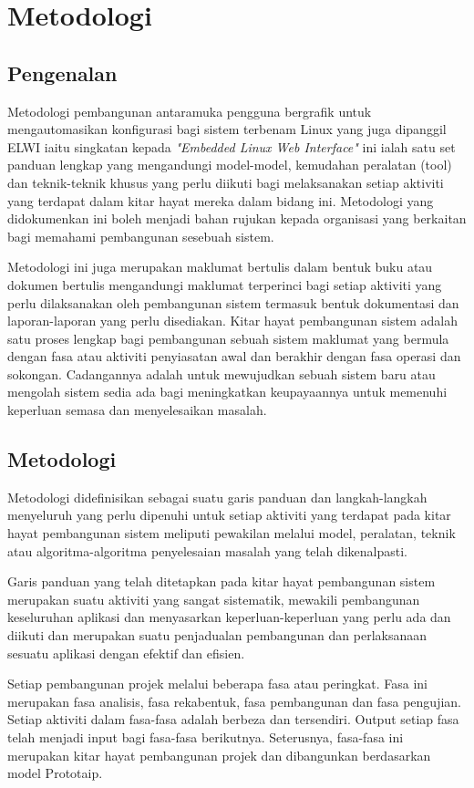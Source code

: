 \chapter{Metodologi}\label{c3}

\section{Pengenalan}
Metodologi pembangunan antaramuka pengguna bergrafik untuk mengautomasikan konfigurasi bagi sistem terbenam Linux yang juga dipanggil ELWI iaitu singkatan kepada \textit{"Embedded Linux Web Interface"} ini ialah satu set panduan lengkap yang mengandungi model-model, kemudahan peralatan (tool) dan teknik-teknik khusus yang perlu diikuti bagi melaksanakan setiap aktiviti yang terdapat dalam kitar hayat mereka dalam bidang ini. Metodologi yang didokumenkan ini boleh menjadi bahan rujukan kepada organisasi yang berkaitan bagi memahami pembangunan sesebuah sistem. 

Metodologi ini juga merupakan maklumat bertulis dalam bentuk buku atau dokumen bertulis mengandungi maklumat terperinci bagi setiap aktiviti yang perlu dilaksanakan oleh pembangunan sistem termasuk bentuk dokumentasi dan laporan-laporan yang perlu disediakan. Kitar hayat pembangunan sistem adalah satu proses lengkap bagi pembangunan sebuah sistem maklumat yang bermula dengan fasa atau aktiviti penyiasatan awal dan berakhir dengan fasa operasi dan sokongan. Cadangannya adalah untuk mewujudkan sebuah sistem baru atau mengolah sistem sedia ada bagi meningkatkan keupayaannya untuk memenuhi keperluan semasa dan menyelesaikan masalah.

\section{Metodologi}
Metodologi didefinisikan sebagai suatu garis panduan dan langkah-langkah menyeluruh yang perlu dipenuhi untuk setiap aktiviti yang terdapat pada kitar hayat pembangunan sistem meliputi pewakilan melalui model, peralatan, teknik atau algoritma-algoritma penyelesaian masalah yang telah dikenalpasti. 

Garis panduan yang telah ditetapkan pada kitar hayat pembangunan sistem merupakan suatu aktiviti yang sangat sistematik, mewakili pembangunan keseluruhan aplikasi dan menyasarkan keperluan-keperluan yang perlu ada dan diikuti dan merupakan suatu penjadualan pembangunan dan perlaksanaan sesuatu aplikasi dengan efektif dan efisien.

Setiap pembangunan projek melalui beberapa fasa atau peringkat. Fasa ini merupakan fasa analisis, fasa rekabentuk, fasa pembangunan dan fasa pengujian. Setiap aktiviti dalam fasa-fasa adalah berbeza dan tersendiri. Output setiap fasa telah menjadi input bagi fasa-fasa berikutnya. Seterusnya, fasa-fasa ini merupakan kitar hayat pembangunan projek dan dibangunkan berdasarkan model Prototaip.

